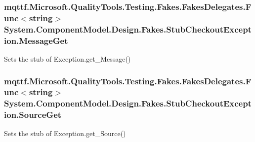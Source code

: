 \hypertarget{class_system_1_1_component_model_1_1_design_1_1_fakes_1_1_stub_checkout_exception_a73bc01fef43cb3132834bc9d76c9d25d}{
\subsubsection[{Message\-Get}]{\setlength{\rightskip}{0pt plus 5cm}mqttf.\-Microsoft.\-Quality\-Tools.\-Testing.\-Fakes.\-Fakes\-Delegates.\-Func$<$string$>$ System.\-Component\-Model.\-Design.\-Fakes.\-Stub\-Checkout\-Exception.\-Message\-Get}}\label{class_system_1_1_component_model_1_1_design_1_1_fakes_1_1_stub_checkout_exception_a73bc01fef43cb3132834bc9d76c9d25d}


Sets the stub of Exception.\-get\-\_\-\-Message()

\hypertarget{class_system_1_1_component_model_1_1_design_1_1_fakes_1_1_stub_checkout_exception_af182629cfb292244a5b4e37573676f7a}{
\subsubsection[{Source\-Get}]{\setlength{\rightskip}{0pt plus 5cm}mqttf.\-Microsoft.\-Quality\-Tools.\-Testing.\-Fakes.\-Fakes\-Delegates.\-Func$<$string$>$ System.\-Component\-Model.\-Design.\-Fakes.\-Stub\-Checkout\-Exception.\-Source\-Get}}\label{class_system_1_1_component_model_1_1_design_1_1_fakes_1_1_stub_checkout_exception_af182629cfb292244a5b4e37573676f7a}


Sets the stub of Exception.\-get\-\_\-\-Source()

